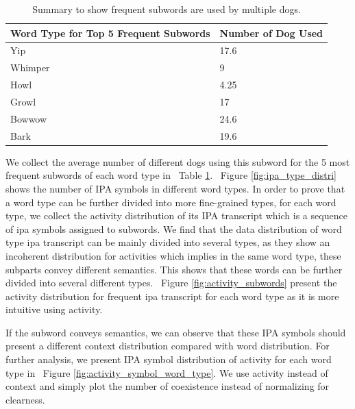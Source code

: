 \documentclass[letterpaper]{article}
\newcommand{\figref}[1]{Figure \ref{#1}}
\newcommand{\tabref}[1]{Table \ref{#1}}
\begin{document}
\begin{table}[t!]
\small
\centering
\begin{tabular}{p{}|p{}}
\toprule
\textbf{Word Type for Top 5 Frequent Subwords} & \textbf{Number of Dog Used} \\
\hline
Yip & 17.6 \\
\hline
Whimper & 9 \\
\hline
Howl & 4.25\\
\hline
Growl & 17 \\
\hline
Bowwow & 24.6 \\
\hline
Bark & 19.6 \\
\bottomrule
\end{tabular}
\caption{Summary to show frequent subwords are used by multiple dogs.}
\label{tab:subwords}
\end{table}

We collect the average number of different dogs using this subword for the 5 most frequent subwords of each word type in ~\tabref{tab:subwords}. ~\figref{fig:ipa_type_distri} shows the number of IPA symbols in different word types.
In order to prove that a word type can be further divided into more fine-grained types, for each word type, we collect the activity distribution of its IPA transcript which is a sequence of ipa symbols assigned to subwords. We find that the data distribution of word type ipa transcript can be mainly divided into several types, as they show an incoherent distribution for activities which implies in the same word type, these subparts convey different semantics. This shows that these words can be further divided into several different types. ~\figref{fig:activity_subwords} present the activity distribution for frequent ipa transcript for each word type as it is more intuitive using activity. 

If the subword conveys semantics, we can observe that these IPA symbols should present a different context distribution compared with word distribution.   For further analysis, we present IPA symbol distribution of activity for each word type in ~\figref{fig:activity_symbol_word_type}. We use activity instead of context and simply plot the number of coexistence instead of normalizing for clearness. 
\end{document}
